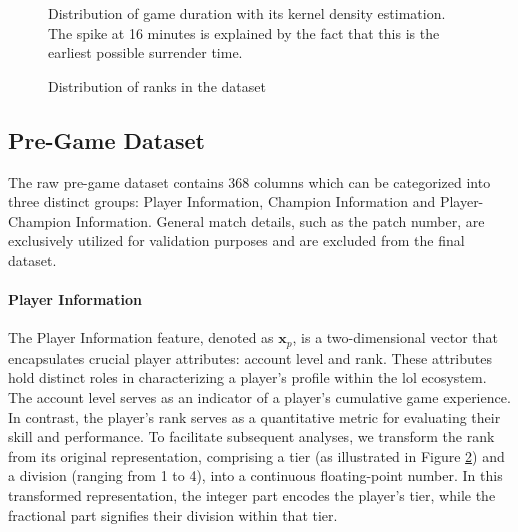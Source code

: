 \documentclass[12pt, a4paper, headinclude, twoside, plainheadsepline, open=right, numbers=noenddot, hidelinks, toc=listof, toc=bibliography]{scrreprt}
\begin{document}
\begin{figure}[ht]

\caption{Distribution of game duration with its kernel density estimation. The spike at 16 minutes is explained by the fact that this is the earliest possible surrender time.}
\label{fig:gameDuration}
\end{figure}


\begin{figure}
\resizebox{\textwidth}{!}{}
\caption{Distribution of ranks in the dataset}
\label{fig:tier}
\end{figure}


\subsection{Pre-Game Dataset}
\label{ssec:pre_game_data}

The raw pre-game dataset contains $368$ columns which can be categorized into three distinct groups: Player Information, Champion Information and Player-Champion Information.
General match details, such as the patch number, are exclusively utilized for validation purposes and are excluded from the final dataset.

\paragraph{Player Information}
The Player Information feature, denoted as $\mathbf{x}_p$, is a two-dimensional vector that encapsulates crucial player attributes: account level and rank. 
These attributes hold distinct roles in characterizing a player's profile within the \acl{lol} ecosystem. 
The account level serves as an indicator of a player's cumulative game experience.
In contrast, the player's rank serves as a quantitative metric for evaluating their skill and performance. 
To facilitate subsequent analyses, we transform the rank from its original representation, comprising a tier (as illustrated in Figure \ref{fig:tier}) and a division (ranging from 1 to 4), into a continuous floating-point number. 
In this transformed representation, the integer part encodes the player's tier, while the fractional part signifies their division within that tier.
\end{document}
